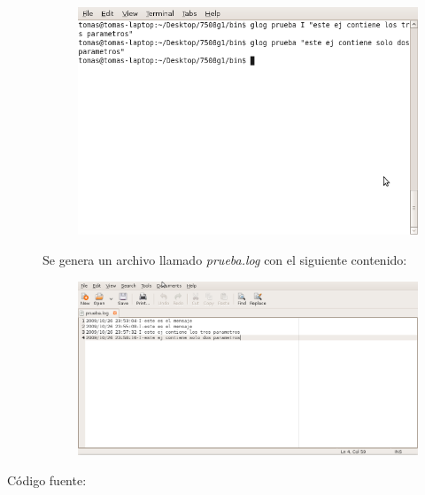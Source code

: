 \documentclass[12pt]{article}
\begin{document}
\begin{description}
		\begin{figure}[H]
		\centering
		\includegraphics[scale=0.35]{imagenes/glog/01.png}
		\end{figure}
	
		Se genera un archivo llamado \emph{prueba.log} con el siguiente contenido:
	
		\begin{figure}[H]
		\centering
		\includegraphics[scale=0.35]{imagenes/glog/02.png}
		\end{figure}
	
	
	\item [Código fuente:]
\end{description}
\end{document}
